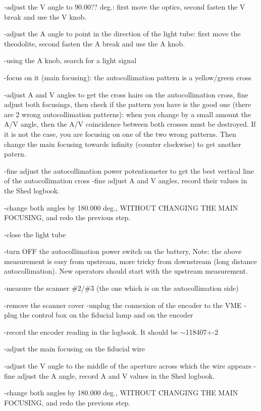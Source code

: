 -adjust the V angle to 90.00?? deg.: first move the optics, second
fasten the V break and use the V knob. 

-adjust the A angle to point in the direction of the light tube: first move
the theodolite, second fasten the A break and use the A knob. 

-using the A knob, search for a light signal 

-focus on it (main focusing): the autocollimation pattern is a yellow/green cross 

-adjust A and V angles to get the cross hairs on the autocollimation cross,
fine adjust both focusings, then check if the pattern you have is the good one
(there are 2 wrong autocollimation patterns): when you change by a small amount
the A/V angle, then the A/V coincidence between both crosses must be destroyed.
If it is not the case, you are focusing on one of the two wrong patterns. Then
change the main focusing towards infinity (counter clockwise) to get another
patern. 

-fine adjust the autocollimation power potentiometer to get the best vertical
line of the autocollimation cross -fine adjust A and V angles, record their
values in the Shed logbook. 

-change both angles by 180.000 deg., WITHOUT CHANGING THE MAIN FOCUSING, and
redo the previous step. 

-close the light tube 

-turn OFF the autocollimation power switch on the battery, Note: the above measurement
is easy from upstream, more tricky from downstream (long distance autocollimation).
New operators should start with the upstream measurement.

-measure the scanner \#2/\#3 (the one which is on the autocollimation side) 

-remove the scanner cover -unplug the connexion of the encoder to the VME -plug
the control box on the fiducial lamp and on the encoder 

-record the encoder reading in the logbook. It should be \( \sim  \)118407+-2 

-adjust the main focusing on the fiducial wire 

-adjust the V angle to the middle of the aperture across which the wire appears
-fine adjust the A angle, record A and V values in the Shed logbook. 

-change both angles by 180.000 deg., WITHOUT CHANGING THE MAIN FOCUSING, and
redo the previous step. 

